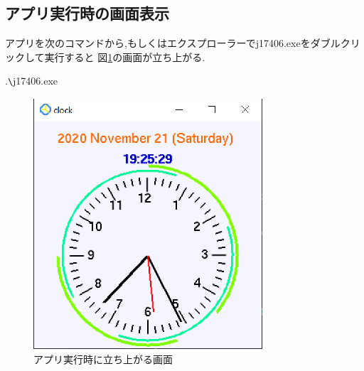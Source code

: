 \documentclass[a4j]{jarticle}
\begin{document}
    \subsection{アプリ実行時の画面表示}
    アプリを次のコマンドから,もしくはエクスプローラーでj17406.exeをダブルクリックして実行すると
    図\ref{start}の画面が立ち上がる.
    \begin{screen}
.\verb*|\|j17406.exe
        \end{screen}
            
  \begin{figure}[H]
      \centering
      \includegraphics[scale=1.2]{start.eps}
      \caption{アプリ実行時に立ち上がる画面}
       \label{start}
      \end{figure}
\end{document}
